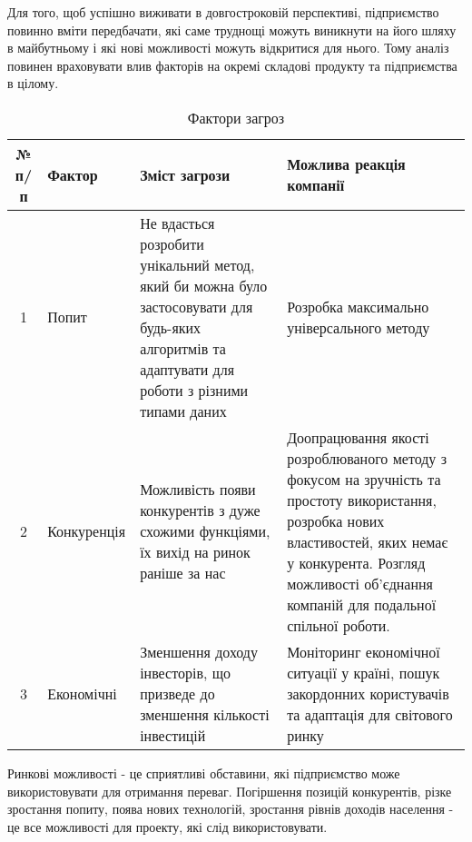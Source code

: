 Для того, щоб успішно виживати в довгостроковій перспективі, підприємство повинно вміти передбачати, які саме труднощі можуть виникнути на його шляху в майбутньому і які нові можливості можуть відкритися для нього. Тому аналіз повинен враховувати влив факторів на окремі складові продукту та підприємства в цілому.

\begin{table}[h!]
\fontsize{12pt}{12pt}\selectfont
	\begin{tabularx}{\textwidth}{|c|X|X|X|}
    \hline
    № п/п & Фактор & Зміст загрози & Можлива реакція компанії \\ \hline
    1 & Попит & Не вдасться розробити унікальний метод, який би можна було застосовувати для будь-яких алгоритмів та адаптувати для роботи з різними типами даних & Розробка максимально універсального методу \\ \hline 
    2 & Конкуренція & Можливість появи конкурентів з дуже схожими функціями, їх вихід на ринок раніше за нас & Доопрацювання якості розроблюваного методу з фокусом на зручність та простоту використання, розробка нових властивостей, яких немає у конкурента. Розгляд можливості об'єднання компаній для подальної спільної роботи. \\ \hline 
    3 & Економічні & Зменшення доходу інвесторів, що призведе до зменшення кількості інвестицій & Моніторинг економічної ситуації у країні, пошук закордонних користувачів та адаптація для світового ринку \\
    \hline
    \end{tabularx}
\caption{Фактори загроз} \label{tab:stab_3}
\end{table}

Ринкові можливості - це сприятливі обставини, які підприємство може використовувати для отримання переваг. Погіршення позицій конкурентів, різке зростання попиту, поява нових технологій, зростання рівнів доходів населення - це все можливості для проекту, які слід використовувати.

